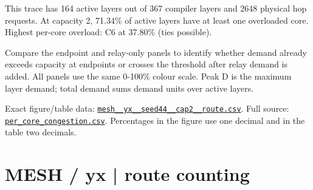 \documentclass[10pt,a4paper]{article}
\begin{document}
This trace has 164 active layers out of 367 compiler layers and 2648 physical hop requests. At capacity 2, 71.34\% of active layers have at least one overloaded core. Highest per-core overload: C6 at 37.80\% (ties possible).\par
Compare the endpoint and relay-only panels to identify whether demand already exceeds capacity at endpoints or crosses the threshold after relay demand is added. All panels use the same 0-100\% colour scale. Peak D is the maximum layer demand; total demand sums demand units over active layers.\par
Exact figure/table data: \href{\detokenize{file:///home/dhruv-pansuriya/Documents/BTP/Compiler-Driven-ACE/output/pdf/qaoa_methods_congestion/tables/mesh__yx__seed44__cap2__route.csv}}{\nolinkurl{mesh__yx__seed44__cap2__route.csv}}. Full source: \href{\detokenize{file:///home/dhruv-pansuriya/Documents/BTP/Compiler-Driven-ACE/results/qaoa_2seed_2026-10-26/congestion/per_core_congestion.csv}}{\nolinkurl{per_core_congestion.csv}}. Percentages in the figure use one decimal and in the table two decimals.\par
\clearpage
\section*{MESH / yx | route counting}
\end{document}
